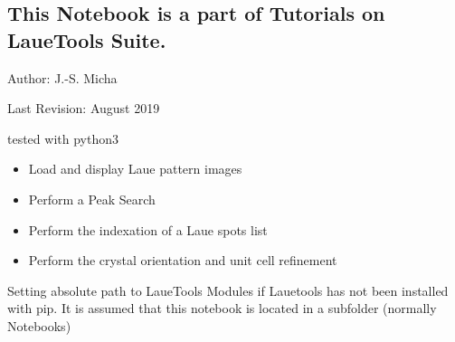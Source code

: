 \documentclass[letterpaper,10pt,english]{sphinxmanual}
\begin{document}
\subsection{This Notebook is a part of Tutorials on LaueTools Suite.}
\label{\detokenize{Basic_PeakSearch_IndexRefine:this-notebook-is-a-part-of-tutorials-on-lauetools-suite}}
Author: J.-S. Micha

Last Revision: August 2019

tested with python3

\begin{itemize}
\item {} 
Load and display Laue pattern images

\item {} 
Perform a Peak Search

\item {} 
Perform the indexation of a Laue spots list

\item {} 
Perform the crystal orientation and unit cell refinement

\end{itemize}

Setting absolute path to LaueTools Modules if Lauetools has not been
installed with pip. It is assumed that this notebook is located in a
subfolder (normally Notebooks)

%
\begin{sphinxVerbatim}[commandchars=\\\{\}]
  
 
 
\end{sphinxVerbatim}

%
\begin{sphinxVerbatim}[commandchars=\\\{\}]
 
\end{sphinxVerbatim}
\end{document}
